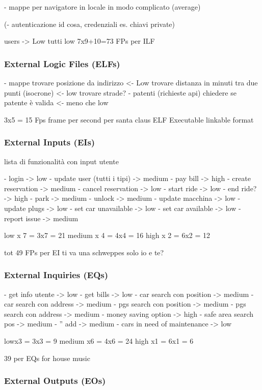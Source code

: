 \documentclass[english]{article}
\begin{document}
- mappe per navigatore in locale
in modo complicato
(average)

(- autenticazione
id cosa, credenziali es. chiavi private)

users -> Low
tutti low
7x9+10=73 FPs per ILF

\subsubsection{External Logic Files (ELFs)}

- mappe
trovare posizione da indirizzo <- Low
trovare distanza in minuti tra due punti (isocrone) <- low
trovare strade?
- patenti (richieste api)
chiedere se patente è valida <- meno che low

3x5 = 15 Fps frame per second per santa claus ELF Executable linkable format

\subsubsection{External Inputs (EIs)}

lista di funzionalità con input utente

- login -> low
- update user (tutti i tipi) -> medium
- pay bill -> high
- create reservation -> medium
- cancel reservation -> low
- start ride -> low
- end ride? -> high
- park -> medium 
- unlock -> medium
- update macchina -> low
- update plugs -> low
- set car unavailable -> low
- set car available -> low
- report issue -> medium

low x 7 = 3x7 = 21
medium x 4 = 4x4 = 16
high x 2 = 6x2 = 12

tot 49 FPs per EI ti va una schweppes solo io e te?


\subsubsection{External Inquiries (EQs)}

- get info utente -> low
- get bills -> low
- car search con position -> medium
- car search con address -> medium
- pgs search con position -> medium
- pgs search con address -> medium
- money saving option -> high
- safe area search pos -> medium
- '' add -> medium
- cars in need of maintenance -> low

lowx3 = 3x3 = 9
medium x6 = 4x6 = 24
high x1 = 6x1 = 6

39 per EQs for house music

\subsubsection{External Outputs (EOs)}
\end{document}
